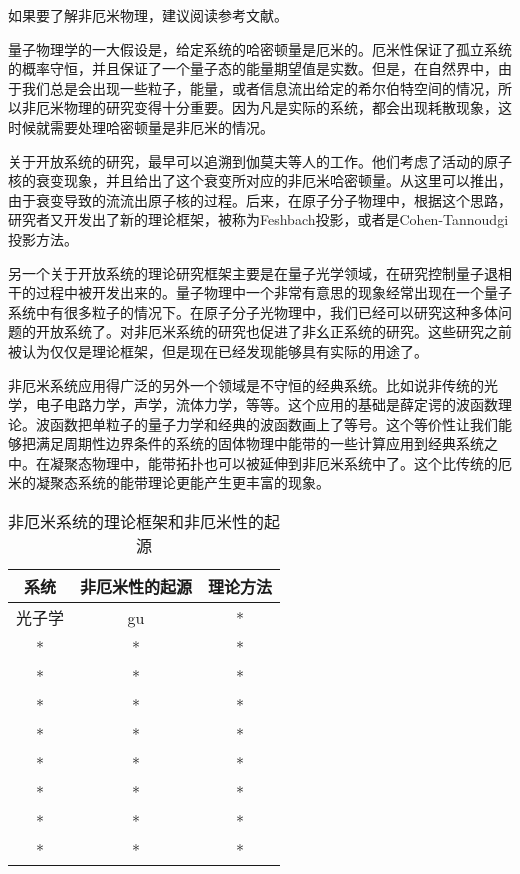 
如果要了解非厄米物理，建议阅读参考文献\cite{Ashida:2020dkc}。

量子物理学的一大假设是，给定系统的哈密顿量是厄米的。厄米性保证了孤立系统的概率守恒，并且保证了一个量子态的能量期望值是实数。但是，在自然界中，由于我们总是会出现一些粒子，能量，或者信息流出给定的希尔伯特空间的情况，所以非厄米物理的研究变得十分重要。因为凡是实际的系统，都会出现耗散现象，这时候就需要处理哈密顿量是非厄米的情况。

关于开放系统的研究，最早可以追溯到伽莫夫等人的工作。他们考虑了活动的原子核的衰变现象，并且给出了这个衰变所对应的非厄米哈密顿量。从这里可以推出，由于衰变导致的流流出原子核的过程。后来，在原子分子物理中，根据这个思路，研究者又开发出了新的理论框架，被称为Feshbach投影，或者是Cohen-Tannoudgi投影方法。

另一个关于开放系统的理论研究框架主要是在量子光学领域，在研究控制量子退相干的过程中被开发出来的。量子物理中一个非常有意思的现象经常出现在一个量子系统中有很多粒子的情况下。在原子分子光物理中，我们已经可以研究这种多体问题的开放系统了。对非厄米系统的研究也促进了非幺正系统的研究。这些研究之前被认为仅仅是理论框架，但是现在已经发现能够具有实际的用途了。

非厄米系统应用得广泛的另外一个领域是不守恒的经典系统。比如说非传统的光学，电子电路力学，声学，流体力学，等等。这个应用的基础是薛定谔的波函数理论。波函数把单粒子的量子力学和经典的波函数画上了等号。这个等价性让我们能够把满足周期性边界条件的系统的固体物理中能带的一些计算应用到经典系统之中。在凝聚态物理中，能带拓扑也可以被延伸到非厄米系统中了。这个比传统的厄米的凝聚态系统的能带理论更能产生更丰富的现象。

\begin{table}[ht]
\centering
\caption{非厄米系统的理论框架和非厄米性的起源}\label{tab_nonHer1}
\begin{tabular}{|c|c|c|}
\hline
系统 & 非厄米性的起源 & 理论方法 \\
\hline
光子学 & gu & * \\
\hline
* & * & * \\
\hline
* & * & * \\
\hline
* & * & * \\
\hline
* & * & * \\
\hline
* & * & * \\
\hline
* & * & * \\
\hline
* & * & * \\
\hline
* & * & * \\
\hline
\end{tabular}
\end{table}

